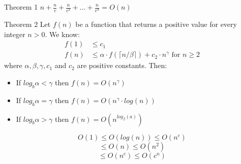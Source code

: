 \documentclass{lecture}
\begin{document}
\begin{landscape}
\begin{multicols}{3}
    \begin{note}{Theorem 1}
        $n+\frac{n}{c}+\frac{n}{c^2}+\ldots+\frac{n}{c^h}=O(n)$
    \end{note}
    \vfill
    \begin{note}{Theorem 2}
        Let $f(n)$ be a function that returns a positive value for every integer $n>0$. We know:
        \begin{align*}
            f(1) & \leqslant c_1\\
            f(n) & \leqslant \alpha \cdot f(\lceil n / \beta \rceil) + c_2 \cdot n^{\gamma} \text{ for } n \geqslant 2
        \end{align*}
        where $\alpha, \beta, \gamma, c_1$ and $c_2$ are positive constants. Then:
        \begin{itemize}
            \item If $log_{b} \alpha < \gamma$ then $f(n) = O(n^\gamma)$
            \item If $log_{b} \alpha = \gamma$ then $f(n) = O(n^\gamma \cdot log(n))$
            \item If $log_{b} \alpha > \gamma$ then $f(n) = O(n^{log_\beta(a)})$
        \end{itemize}
    \end{note}
    \vfill

    \begin{note}{}
        $$O(1) \leqslant O(log(n)) \leqslant O(n^c)$$ 
        $$\leqslant O(n) \leqslant O(n^2)$$ 
        $$\leqslant O(n^c) \leqslant O(c^n)$$
    \end{note}
    \vfill

\end{multicols}

\end{landscape}
\end{document}
